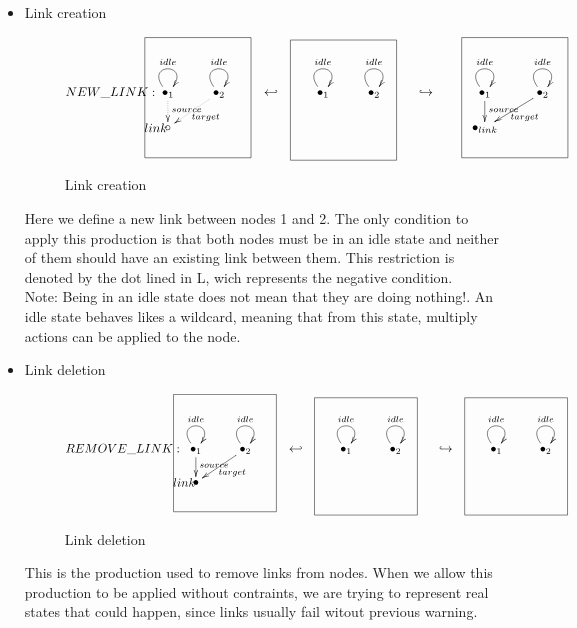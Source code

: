 \documentclass[envcountsect,runningheads]{llncs}
\begin{document}
\begin{itemize}
  \item Link creation
  \begin{figure}[H]
    \[
       \xymatrix@C=25pt@R=16pt
       {
        {\bullet}_{1}\ar@(ul,ur)^{idle} \ar@{.>}^{source}[d]
        \POS[]-<3.8pc,0pc>\drop{NEW\_LINK:} &
         {\bullet}_{2}\ar@(ul,ur)^{idle}\ar@{.>}^{target}[dl]
         & {\hookleftarrow} &
         {\bullet}_{1}\ar@(ul,ur)^{idle} &
         {\bullet}_{2}\ar@(ul,ur)^{idle}
         \POS[]+<-2pc,-.5pc>*+=<7pc,8pc>[F-]{} & {\hookrightarrow} &
         {\bullet}_{1}\ar@(ul,ur)^{idle} \ar@{->}^{source}[d] &
         {\bullet}_{2} \ar@(ul,ur)^{idle}\ar@{->}^{target}[dl]
         \\
         \circ \POS[]-<.8pc,0pc> \drop{link}
         \POS[]+<2pc,2pc>*+=<7pc,8pc>[F-]{} & & & & & &
         {\bullet}_{link} 
         \POS[]+<2pc,2pc>*+=<7pc,8pc>[F-]{} 
       }
    \]
    \caption{Link creation}
    \protect\label{fig:linkcreation}
  \end{figure}
  Here we define a new link between nodes 1 and 2. The only condition to apply 
  this production is that both nodes must be in an idle state and neither of them should have an 
  existing link between them. This restriction is denoted by the dot lined in L, 
  wich represents the negative condition.\\
  Note: Being in an idle state does not mean that they are doing nothing!. An 
  idle state behaves likes a wildcard, meaning that from this state, multiply actions 
  can be applied to the node.\\
  
  \item Link deletion
  \begin{figure}[H]
    \[
       \xymatrix@C=25pt@R=16pt
       {
        {\bullet}_{1}\ar@(ul,ur)^{idle} \ar@{->}^{source}[d]
        \POS[]-<5pc,0pc>\drop{REMOVE\_LINK:} &
         {\bullet}_{2}\ar@(ul,ur)^{idle}\ar@{->}^{target}[dl]
         & {\hookleftarrow} &
         {\bullet}_{1}\ar@(ul,ur)^{idle} &
         {\bullet}_{2}\ar@(ul,ur)^{idle}
         \POS[]+<-2pc,-.5pc>*+=<7pc,8pc>[F-]{} & {\hookrightarrow} &
         {\bullet}_{1}\ar@(ul,ur)^{idle} &
         {\bullet}_{2} \ar@(ul,ur)^{idle}
         \POS[]+<-2pc,-.5pc>*+=<7pc,8pc>[F-]{}
         \\
         {\bullet} \POS[]-<.8pc,0pc> \drop{link}
         \POS[]+<2pc,2pc>*+=<7pc,8pc>[F-]{} 
       }
    \]
    \caption{Link deletion}
    \protect\label{fig:linkdeletion}
  \end{figure}
  This is the production used to remove links from nodes. When we allow this production to be
  applied without contraints, we are trying to represent real states that could happen, since 
  links usually fail witout previous warning.\\
  

\end{itemize}
\end{document}
